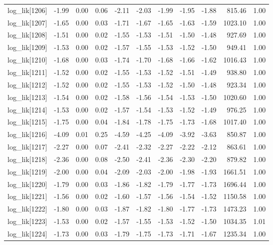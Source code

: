 \begin{table}[ht]
\begin{tabular}{rrrrrrrrrrr}
  log\_lik[1206] & -1.99 & 0.00 & 0.06 & -2.11 & -2.03 & -1.99 & -1.95 & -1.88 & 815.46 & 1.00 \\ 
  log\_lik[1207] & -1.65 & 0.00 & 0.03 & -1.71 & -1.67 & -1.65 & -1.63 & -1.59 & 1023.10 & 1.00 \\ 
  log\_lik[1208] & -1.51 & 0.00 & 0.02 & -1.55 & -1.53 & -1.51 & -1.50 & -1.48 & 927.69 & 1.00 \\ 
  log\_lik[1209] & -1.53 & 0.00 & 0.02 & -1.57 & -1.55 & -1.53 & -1.52 & -1.50 & 949.41 & 1.00 \\ 
  log\_lik[1210] & -1.68 & 0.00 & 0.03 & -1.74 & -1.70 & -1.68 & -1.66 & -1.62 & 1016.43 & 1.00 \\ 
  log\_lik[1211] & -1.52 & 0.00 & 0.02 & -1.55 & -1.53 & -1.52 & -1.51 & -1.49 & 938.80 & 1.00 \\ 
  log\_lik[1212] & -1.52 & 0.00 & 0.02 & -1.55 & -1.53 & -1.52 & -1.50 & -1.48 & 923.34 & 1.00 \\ 
  log\_lik[1213] & -1.54 & 0.00 & 0.02 & -1.58 & -1.56 & -1.54 & -1.53 & -1.50 & 1020.60 & 1.00 \\ 
  log\_lik[1214] & -1.53 & 0.00 & 0.02 & -1.57 & -1.54 & -1.53 & -1.52 & -1.49 & 976.25 & 1.00 \\ 
  log\_lik[1215] & -1.75 & 0.00 & 0.04 & -1.84 & -1.78 & -1.75 & -1.73 & -1.68 & 1017.40 & 1.00 \\ 
  log\_lik[1216] & -4.09 & 0.01 & 0.25 & -4.59 & -4.25 & -4.09 & -3.92 & -3.63 & 850.87 & 1.00 \\ 
  log\_lik[1217] & -2.27 & 0.00 & 0.07 & -2.41 & -2.32 & -2.27 & -2.22 & -2.12 & 863.61 & 1.00 \\ 
  log\_lik[1218] & -2.36 & 0.00 & 0.08 & -2.50 & -2.41 & -2.36 & -2.30 & -2.20 & 879.82 & 1.00 \\ 
  log\_lik[1219] & -2.00 & 0.00 & 0.04 & -2.09 & -2.03 & -2.00 & -1.98 & -1.93 & 1661.51 & 1.00 \\ 
  log\_lik[1220] & -1.79 & 0.00 & 0.03 & -1.86 & -1.82 & -1.79 & -1.77 & -1.73 & 1696.44 & 1.00 \\ 
  log\_lik[1221] & -1.56 & 0.00 & 0.02 & -1.60 & -1.57 & -1.56 & -1.54 & -1.52 & 1150.58 & 1.00 \\ 
  log\_lik[1222] & -1.80 & 0.00 & 0.03 & -1.87 & -1.82 & -1.80 & -1.77 & -1.73 & 1473.23 & 1.00 \\ 
  log\_lik[1223] & -1.53 & 0.00 & 0.02 & -1.57 & -1.55 & -1.53 & -1.52 & -1.50 & 1034.35 & 1.01 \\ 
  log\_lik[1224] & -1.73 & 0.00 & 0.03 & -1.79 & -1.75 & -1.73 & -1.71 & -1.67 & 1235.34 & 1.00 \\ 

\end{tabular}
\end{table}
